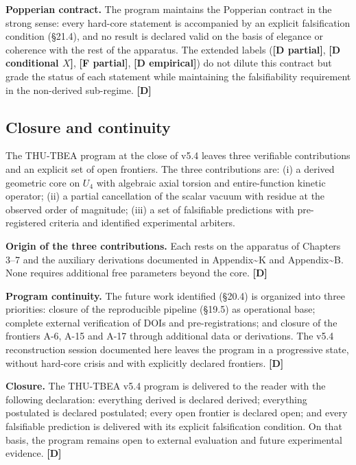 ﻿\documentclass[11pt,letterpaper]{article}
\begin{document}
\textbf{Popperian contract.} The program maintains the Popperian contract in the strong sense: every hard-core statement is accompanied by an explicit falsification condition (§21.4), and no result is declared valid on the basis of elegance or coherence with the rest of the apparatus. The extended labels (\textbf{[D partial]}, \textbf{[D conditional $X$]}, \textbf{[F partial]}, \textbf{[D empirical]}) do not dilute this contract but grade the status of each statement while maintaining the falsifiability requirement in the non-derived sub-regime. \textbf{[D]}
\subsection{Closure and continuity}
The THU-TBEA program at the close of v5.4 leaves three verifiable contributions and an explicit set of open frontiers. The three contributions are: (i) a derived geometric core on $U_4$ with algebraic axial torsion and entire-function kinetic operator; (ii) a partial cancellation of the scalar vacuum with residue at the observed order of magnitude; (iii) a set of falsifiable predictions with pre-registered criteria and identified experimental arbiters.

\textbf{Origin of the three contributions.} Each rests on the apparatus of Chapters 3--7 and the auxiliary derivations documented in Appendix\textasciitilde{}K and Appendix\textasciitilde{}B. None requires additional free parameters beyond the core. \textbf{[D]}

\textbf{Program continuity.} The future work identified (§20.4) is organized into three priorities: closure of the reproducible pipeline (§19.5) as operational base; complete external verification of DOIs and pre-registrations; and closure of the frontiers A-6, A-15 and A-17 through additional data or derivations. The v5.4 reconstruction session documented here leaves the program in a progressive state, without hard-core crisis and with explicitly declared frontiers. \textbf{[D]}

\textbf{Closure.} The THU-TBEA v5.4 program is delivered to the reader with the following declaration: everything derived is declared derived; everything postulated is declared postulated; every open frontier is declared open; and every falsifiable prediction is delivered with its explicit falsification condition. On that basis, the program remains open to external evaluation and future experimental evidence. \textbf{[D]}

\newpage
\appendix
\end{document}
